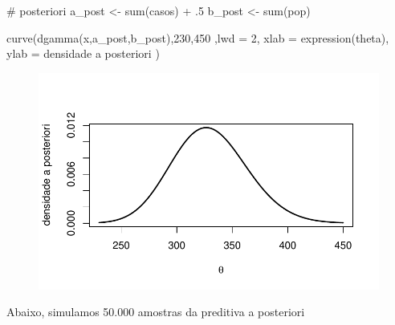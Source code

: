 \documentclass[
  letterpaper,
  DIV=11,
  numbers=noendperiod]{scrreprt}
\newenvironment{Shaded}{\begin{snugshade}}{\end{snugshade}}
\newcommand{\AttributeTok}[1]{\textcolor[rgb]{0.40,0.45,0.13}{#1}}
\newcommand{\CommentTok}[1]{\textcolor[rgb]{0.37,0.37,0.37}{#1}}
\newcommand{\DecValTok}[1]{\textcolor[rgb]{0.68,0.00,0.00}{#1}}
\newcommand{\FunctionTok}[1]{\textcolor[rgb]{0.28,0.35,0.67}{#1}}
\newcommand{\NormalTok}[1]{\textcolor[rgb]{0.00,0.23,0.31}{#1}}
\newcommand{\OtherTok}[1]{\textcolor[rgb]{0.00,0.23,0.31}{#1}}
\newcommand{\SpecialCharTok}[1]{\textcolor[rgb]{0.37,0.37,0.37}{#1}}
\newcommand{\StringTok}[1]{\textcolor[rgb]{0.13,0.47,0.30}{#1}}
\theoremstyle{definition}
\theoremstyle{definition}
\theoremstyle{remark}
\begin{document}
\begin{Shaded}
\begin{Highlighting}[]
\CommentTok{\# posteriori}
\NormalTok{a\_post }\OtherTok{\textless{}{-}} \FunctionTok{sum}\NormalTok{(casos) }\SpecialCharTok{+}\NormalTok{ .}\DecValTok{5}
\NormalTok{b\_post }\OtherTok{\textless{}{-}} \FunctionTok{sum}\NormalTok{(pop)}

\FunctionTok{curve}\NormalTok{(}\FunctionTok{dgamma}\NormalTok{(x,a\_post,b\_post),}\DecValTok{230}\NormalTok{,}\DecValTok{450}\NormalTok{ ,}\AttributeTok{lwd =} \DecValTok{2}\NormalTok{, }\AttributeTok{xlab =} \FunctionTok{expression}\NormalTok{(theta), }\AttributeTok{ylab =} \StringTok{\textquotesingle{}densidade a posteriori\textquotesingle{}}\NormalTok{ )}
\end{Highlighting}
\end{Shaded}

\begin{figure}[H]

{\centering \includegraphics{poisson_files/figure-pdf/unnamed-chunk-2-1.pdf}

}

\end{figure}

Abaixo, simulamos 50.000 amostras da preditiva a posteriori
\end{document}
